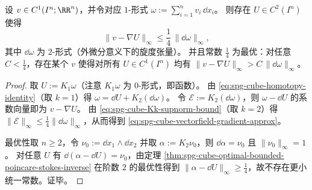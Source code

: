 \begin{corollary}[旋度控制下的势函数重构与最优常数]\label{cor:spg-cube-potential-reconstruction-by-curl}
设 \(v\in C^1(I^n;\RR^n)\)，并令对应 \(1\)-形式
\(
\omega:=\sum_{i=1}^n v_i\,\dd x_i
\)。
则存在 \(U\in C^2(I^n)\) 使得
\begin{equation}\label{eq:spg-cube-vectorfield-gradient-approx}
\|v-\nabla U\|_\infty\le \frac14\,\|\dd\omega\|_\infty,
\end{equation}
其中 \(\dd\omega\) 为 \(2\)-形式（外微分意义下的旋度张量）。
并且常数 \(\frac14\) 为最优：对任意 \(C<\frac14\)，存在某个 \(v\) 使得对所有 \(U\in C^1(I^n)\) 均有 \(\|v-\nabla U\|_\infty> C\,\|\dd\omega\|_\infty\)。
\end{corollary}
\begin{proof}
取 \(U:=K_1\omega\)（注意 \(K_1\omega\) 为 \(0\)-形式，即函数）。
由 \eqref{eq:spg-cube-homotopy-identity}（取 \(k=1\)）得 \(\omega=\dd U+K_2(\dd\omega)\)。
令 \(\mathcal{E}:=K_2(\dd\omega)\)，则 \(\omega-\dd U\) 的系数向量即为 \(v-\nabla U\)。
由 \eqref{eq:spg-cube-Kk-supnorm-bound}（取 \(k=2\)）得 \(\|\mathcal{E}\|_\infty\le \frac14\|\dd\omega\|_\infty\)，从而得到 \eqref{eq:spg-cube-vectorfield-gradient-approx}。
\par
最优性取 \(n\ge 2\)，令 \(\nu_0:=\dd x_1\wedge \dd x_2\) 并取 \(\alpha:=K_2\nu_0\)，则 \(\dd\alpha=\nu_0\) 且 \(\|\nu_0\|_\infty=1\)。
对任意 \(U\) 有 \(\dd(\alpha-\dd U)=\nu_0\)，由定理 \ref{thm:spg-cube-optimal-bounded-poincare-stokes-inverse} 在阶数 \(2\) 的最优性得到 \(\|\alpha-\dd U\|_\infty\ge \frac14\)，故不存在更小统一常数。证毕。
\end{proof}





